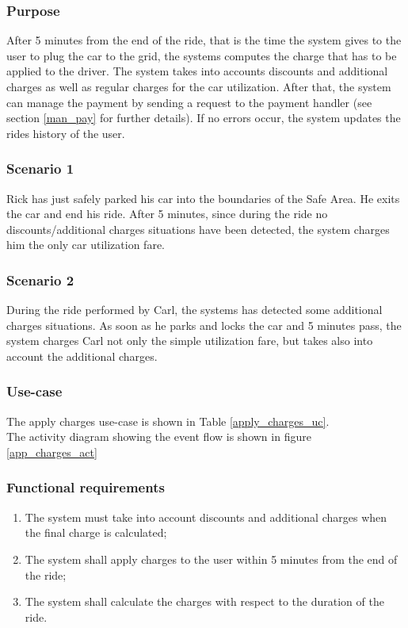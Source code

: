 \subsubsection{Purpose}
After 5 minutes from the end of the ride, that is the time the system gives to the user to plug the car to the grid, the systems computes the charge that has to be applied to the driver. The system takes into accounts discounts and additional charges as well as regular charges for the car utilization. After that, the system can manage the payment by sending a request to the payment handler (see section \ref{man_pay} for further details). If no errors occur, the system updates the rides history of the user.

\subsubsection{Scenario 1}
Rick has just safely parked his car into the boundaries of the Safe Area. He exits the car and end his ride. After 5 minutes, since during the ride no discounts/additional charges situations have been detected, the system charges him the only car utilization fare.

\subsubsection{Scenario 2}
During the ride performed by Carl, the systems has detected some additional charges situations. As soon as he parks and locks the car and 5 minutes pass, the system charges Carl not only the simple utilization fare, but takes also into account the additional charges.

\subsubsection{Use-case}
The apply charges use-case is shown in Table \ref{apply_charges_uc}. \\
The activity diagram showing the event flow is shown in figure \ref{app_charges_act}

\subsubsection{Functional requirements}
\begin{enumerate}
\item The system must take into account discounts and additional charges when the final charge is calculated;
\item The system shall apply charges to the user within 5 minutes from the end of the ride;
\item The system shall calculate the charges with respect to the duration of the ride.
\end{enumerate}

